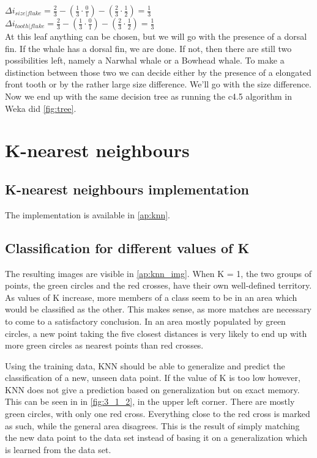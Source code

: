 \documentclass[10pt,a4paper]{article}
\begin{document}
$\Delta i_{size | fluke} = \frac{2}{3} - \left ( \frac{1}{3}  \cdot \frac{0}{1} \right ) - \left ( \frac{2}{3} \cdot \frac{1}{2}\right ) = \frac{1}{3}$\\
$\Delta i_{tooth | fluke} = \frac{2}{3} - \left ( \frac{1}{3}  \cdot \frac{0}{1} \right ) - \left ( \frac{2}{3} \cdot \frac{1}{2}\right ) = \frac{1}{3}$\\
At this leaf anything can be chosen, but we will go with the presence of a dorsal fin. If the whale has a dorsal fin, we are done. If not, then there are still two possibilities left, namely a Narwhal whale or a Bowhead whale. To make a distinction between those two we can decide either by the presence of a elongated front tooth or by the rather large size difference. We'll go with the size difference. Now we end up with the same decision tree as running the c4.5 algorithm in Weka did \autoref{fig:tree}.

\section{K-nearest neighbours}
\subsection{K-nearest neighbours implementation}
The implementation is available in \autoref{ap:knn}.

\subsection{Classification for different values of K} \label{ss:class}
The resulting images are visible in \autoref{ap:knn_img}. When K = 1, the two groups of points, the green circles and the red crosses, have their own well-defined territory. As values of K increase, more members of a class seem to be in an area which would be classified as the other. This makes sense, as more matches are necessary to come to a satisfactory conclusion. In an area mostly populated by green circles, a new point taking the five closest distances is very likely to end up with more green circles as nearest points than red crosses.

Using the training data, KNN should be able to generalize and predict the classification of a new, unseen data point. If the value of K is too low however, KNN does not give a prediction based on generalization but on exact memory. This can be seen in in \autoref{fig:3_1_2}, in the upper left corner. There are mostly green circles, with only one red cross. Everything close to the red cross is marked as such, while the general area disagrees. This is the result of simply matching the new data point to the data set instead of basing it on a generalization which is learned from the data set.
\end{document}
